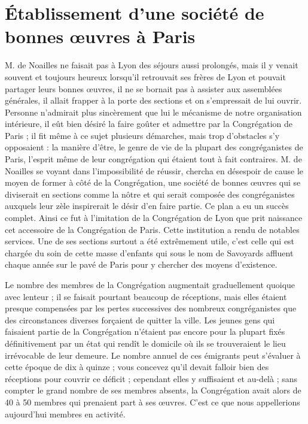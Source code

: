 \section*{Établissement d'une société de bonnes œuvres à Paris}
M. de Noailles ne faisait pas à Lyon des séjours aussi prolongés, mais il y venait souvent et toujours heureux lorsqu'il retrouvait ses frères de Lyon et pouvait partager leurs bonnes œuvres, il ne se bornait pas à assister aux assemblées générales, il allait frapper à la porte des sections et on s'empressait de lui ouvrir. Personne n'admirait plus sincèrement que lui
le mécanisme de notre organisation intérieure, il eût bien désiré la faire goûter et admettre par la Congrégation de Paris ; il fit même à ce sujet plusieurs démarches, mais trop d'obstacles s'y opposaient : la manière d'être, le genre de vie de la plupart des congréganistes de Paris, l'esprit même de leur congrégation qui étaient tout à fait contraires. M. de Noailles se voyant dans l'impossibilité de réussir, chercha en désespoir de cause le moyen de former à côté de la Congrégation, une société de bonnes œuvres qui se diviserait en sections comme la nôtre et qui serait composée des congréganistes auxquels leur zèle inspirerait le désir d'en faire partie. Ce plan a eu un succès complet. Ainsi ce fut à l'imitation de la Congrégation de Lyon que prit naissance cet accessoire de la Congrégation de Paris. Cette institution a rendu de notables services. Une de ses sections surtout a été extrêmement utile, c'est celle qui est chargée du soin de cette masse d'enfants qui sous le nom de Savoyards affluent chaque année sur le pavé de Paris pour y chercher des moyens d'existence.

Le nombre des membres de la Congrégation augmentait graduellement quoique avec lenteur ; il se faisait pourtant beaucoup de réceptions, mais elles étaient presque compensées par les pertes successives des nombreux congréganistes que des circonstances diverses forçaient de quitter la ville. Les jeunes gens qui faisaient partie de la Congrégation n'étaient pas encore pour la plupart fixés définitivement par un état qui rendît le domicile où ils se trouveraient le lieu irrévocable de leur demeure. Le nombre annuel de ces émigrants peut s'évaluer à cette époque de dix à quinze ; vous concevez qu'il devait falloir bien des réceptions
pour couvrir ce déficit ; cependant elles y suffisaient et au-delà ; sans compter le grand nombre de ses membres absents, la Congrégation avait alors de 40 à 50 membres qui prenaient part à ses œuvres. C'est ce que nous appellerions aujourd'hui membres en activité.

